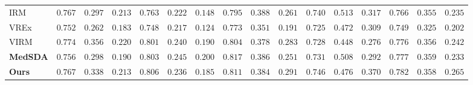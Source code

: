 \begin{table*}[htbp]
\begin{center}
{\begin{tabular}{l|ccc|ccc|ccc|ccc|ccc}
                IRM~\cite{arjovsky2019invariant}   &  $0.767$ & $0.297$ & $0.213$ & $0.763$ & $0.222$ & $0.148$ & $0.795$ &\cellcolor{1st} $0.388$ &\cellcolor{2nd} $0.261$ & \cellcolor{2nd} $0.740$ & $0.513$ & \cellcolor{2nd} $0.317$ & $0.766$ & $0.355$ &  $0.235$ \\
                VREx~\cite{krueger2021out}  & $0.752$ & $0.262$ & $0.183$ & $0.748$ & $0.217$ & $0.124$ & $0.773$ & $0.351$ & $0.191$ & $0.725$ & $0.472$ & $0.309$ & $0.749$ & $0.325$ & $0.202$ \\            
                \hline
                VIRM~\cite{zhu2024enlarging}  & \cellcolor{2nd} $0.774$ & $0.356$ & $0.220$ & $0.801$ & $0.240$ & $0.190$ & $0.804$ & $0.378$ & $0.283$ & $0.728$ & $0.448$ & $0.276$ & $0.776$ & $0.356$ & $0.242$ \\
                \hline
                \textbf{MedSDA} & $0.756$ & $0.298$ & $0.190$ & \cellcolor{2nd} $0.803$ & \cellcolor{2nd} $0.245$ & \cellcolor{2nd} $0.200$ & \cellcolor{1st} $0.817$ & \cellcolor{2nd} $0.386$ & $0.251$ & $0.731$ & $0.508$ & $0.292$ &  \cellcolor{2nd} $0.777$ & $0.359$ & $0.233$ \\
                \textbf{Ours}  &  $0.767$ & $0.338$ & $0.213$ & \cellcolor{1st} $0.806$ & $0.236$ & $0.185$ & \cellcolor{2nd}$0.811$ &  $0.384$ &\cellcolor{1st} $0.291$ & \cellcolor{1st} $0.746$ & $0.476$ & \cellcolor{1st} $0.370$ & \cellcolor{1st} $0.782$ & $0.358$ & \cellcolor{1st} $0.265$ \\
                \hline
        \end{tabular}
    \label{tab:comparison}}
    \end{center}
\end{table*}


